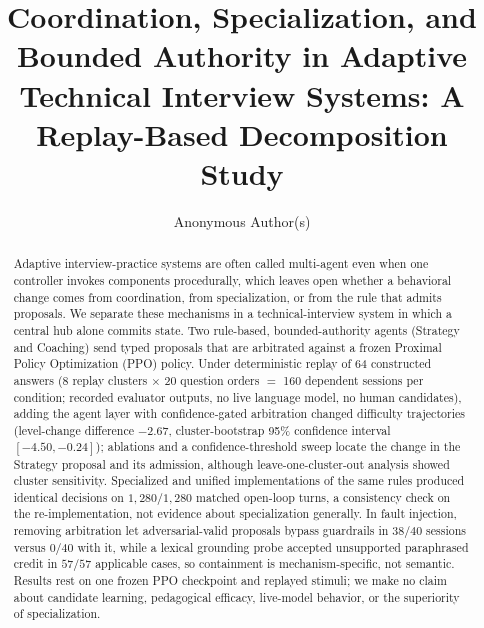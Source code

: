 \documentclass[runningheads,a4paper]{llncs}
\begin{document}
\title{Coordination, Specialization, and Bounded Authority in Adaptive Technical Interview Systems: A Replay-Based Decomposition Study}
\author{Anonymous Author(s)}
\maketitle
\vspace{-1.2em}
\begin{abstract}
Adaptive interview-practice systems are often called multi-agent even when one controller invokes components procedurally, which leaves open whether a behavioral change comes from coordination, from specialization, or from the rule that admits proposals. We separate these mechanisms in a technical-interview system in which a central hub alone commits state. Two rule-based, bounded-authority agents (Strategy and Coaching) send typed proposals that are arbitrated against a frozen Proximal Policy Optimization (PPO) policy. Under deterministic replay of 64 constructed answers (8 replay clusters $\times$ 20 question orders $=$ 160 dependent sessions per condition; recorded evaluator outputs, no live language model, no human candidates), adding the agent layer with confidence-gated arbitration changed difficulty trajectories (level-change difference $-2.67$, cluster-bootstrap 95\% confidence interval $[-4.50, -0.24]$); ablations and a confidence-threshold sweep locate the change in the Strategy proposal and its admission, although leave-one-cluster-out analysis showed cluster sensitivity. Specialized and unified implementations of the same rules produced identical decisions on $1{,}280/1{,}280$ matched open-loop turns, a consistency check on the re-implementation, not evidence about specialization generally. In fault injection, removing arbitration let adversarial-valid proposals bypass guardrails in $38/40$ sessions versus $0/40$ with it, while a lexical grounding probe accepted unsupported paraphrased credit in $57/57$ applicable cases, so containment is mechanism-specific, not semantic. Results rest on one frozen PPO checkpoint and replayed stimuli; we make no claim about candidate learning, pedagogical efficacy, live-model behavior, or the superiority of specialization.
\end{abstract}
\end{document}
